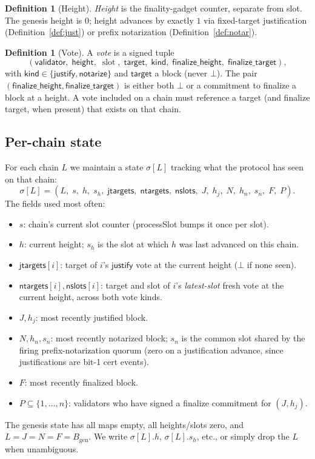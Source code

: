 \documentclass{article}
\newcommand{\genesis}{\ensuremath{B_{\mathrm{gen}}}}
\newcommand{\slot}{\operatorname{\mathrm{slot}}}
\newcommand{\target}{\mathsf{target}}
\newcommand{\kind}{\mathsf{kind}}
\newcommand{\height}{\mathsf{height}}
\newcommand{\validator}{\mathsf{validator}}
\newcommand{\just}{\ensuremath{\mathsf{justify}}\xspace}
\newcommand{\notar}{\ensuremath{\mathsf{notarize}}\xspace}
\newcommand{\finalizeHeight}{\mathsf{finalize\_height}}
\newcommand{\finalizeTarget}{\mathsf{finalize\_target}}
\newcommand{\jtargets}{\mathsf{jtargets}}
\newcommand{\ntargets}{\mathsf{ntargets}}
\newcommand{\nslots}{\mathsf{nslots}}
\newcommand{\processSlot}{\textsf{processSlot}\xspace}
\theoremstyle{plain}
\theoremstyle{definition}
\newtheorem{definition}[theorem]{Definition}
\theoremstyle{remark}
\begin{document}
\begin{definition}[Height]\label{def:height}
\emph{Height} is the finality-gadget counter, separate from slot. The genesis height is $0$; height advances by exactly $1$ via fixed-target justification (Definition~\ref{def:just}) or prefix notarization (Definition~\ref{def:notar}).
\end{definition}

\begin{definition}[Vote]\label{def:vote}
A \emph{vote} is a signed tuple
\[
  (\validator,\; \height,\; \slot,\; \target,\; \kind,\; \finalizeHeight,\; \finalizeTarget),
\]
with $\kind \in \{\just, \notar\}$ and $\target$ a block (never $\bot$). The pair $(\finalizeHeight, \finalizeTarget)$ is either both $\bot$ or a commitment to finalize a block at a height. A vote included on a chain must reference a target (and finalize target, when present) that exists on that chain.
\end{definition}

\subsection{Per-chain state}

For each chain $L$ we maintain a state $\sigma[L]$ tracking what the protocol has seen on that chain:
\[
  \sigma[L] = (L,\; s,\; h,\; s_h,\; \jtargets,\; \ntargets,\; \nslots,\; J,\; h_j,\; N,\; h_n,\; s_n,\; F,\; P).
\]
The fields used most often:
\begin{itemize}
  \item $s$: chain's current slot counter (\processSlot bumps it once per slot).
  \item $h$: current height; $s_h$ is the slot at which $h$ was last advanced on this chain.
  \item $\jtargets[i]$: target of $i$'s \just{} vote at the current height ($\bot$ if none seen).
  \item $\ntargets[i], \nslots[i]$: target and slot of $i$'s \emph{latest-slot} fresh vote at the current height, across both vote kinds.
  \item $J, h_j$: most recently justified block.
  \item $N, h_n, s_n$: most recently notarized block; $s_n$ is the common slot shared by the firing prefix-notarization quorum (zero on a justification advance, since justifications are bit-1 cert events).
  \item $F$: most recently finalized block.
  \item $P \subseteq \{1,\ldots,n\}$: validators who have signed a finalize commitment for $(J, h_j)$.
\end{itemize}
The genesis state has all maps empty, all heights/slots zero, and $L = J = N = F = \genesis$. We write $\sigma[L].h$, $\sigma[L].s_h$, etc., or simply drop the $L$ when unambiguous.
\end{document}
